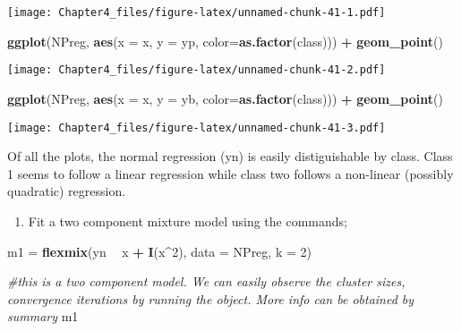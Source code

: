\documentclass[]{article}
\newenvironment{Shaded}{\begin{snugshade}}{\end{snugshade}}
\newcommand{\CommentTok}[1]{\textcolor[rgb]{0.56,0.35,0.01}{\textit{#1}}}
\newcommand{\DataTypeTok}[1]{\textcolor[rgb]{0.13,0.29,0.53}{#1}}
\newcommand{\DecValTok}[1]{\textcolor[rgb]{0.00,0.00,0.81}{#1}}
\newcommand{\KeywordTok}[1]{\textcolor[rgb]{0.13,0.29,0.53}{\textbf{#1}}}
\newcommand{\NormalTok}[1]{#1}
\newcommand{\OperatorTok}[1]{\textcolor[rgb]{0.81,0.36,0.00}{\textbf{#1}}}
\newcommand{\StringTok}[1]{\textcolor[rgb]{0.31,0.60,0.02}{#1}}
\providecommand{\tightlist}{%
  \setlength{\itemsep}{0pt}\setlength{\parskip}{0pt}}
\begin{document}
\texttt{[image: Chapter4\_files/figure-latex/unnamed-chunk-41-1.pdf]}

\begin{Shaded}
\begin{Highlighting}[]
\KeywordTok{ggplot}\NormalTok{(NPreg, }\KeywordTok{aes}\NormalTok{(}\DataTypeTok{x =}\NormalTok{ x, }\DataTypeTok{y =}\NormalTok{ yp, }\DataTypeTok{color=}\KeywordTok{as.factor}\NormalTok{(class))) }\OperatorTok{+}\StringTok{ }\KeywordTok{geom_point}\NormalTok{()}
\end{Highlighting}
\end{Shaded}

\texttt{[image: Chapter4\_files/figure-latex/unnamed-chunk-41-2.pdf]}

\begin{Shaded}
\begin{Highlighting}[]
\KeywordTok{ggplot}\NormalTok{(NPreg, }\KeywordTok{aes}\NormalTok{(}\DataTypeTok{x =}\NormalTok{ x, }\DataTypeTok{y =}\NormalTok{ yb, }\DataTypeTok{color=}\KeywordTok{as.factor}\NormalTok{(class))) }\OperatorTok{+}\StringTok{ }\KeywordTok{geom_point}\NormalTok{()}
\end{Highlighting}
\end{Shaded}

\texttt{[image: Chapter4\_files/figure-latex/unnamed-chunk-41-3.pdf]}

Of all the plots, the normal regression (yn) is easily distiguishable by
class. Class 1 seems to follow a linear regression while class two
follows a non-linear (possibly quadratic) regression.

\begin{enumerate}
\def\labelenumi{\alph{enumi}.}
\setcounter{enumi}{1}
\tightlist
\item
  Fit a two component mixture model using the commands;
\end{enumerate}

\begin{Shaded}
\begin{Highlighting}[]
\NormalTok{m1 =}\StringTok{ }\KeywordTok{flexmix}\NormalTok{(yn }\OperatorTok{~}\StringTok{ }\NormalTok{x }\OperatorTok{+}\StringTok{ }\KeywordTok{I}\NormalTok{(x}\OperatorTok{^}\DecValTok{2}\NormalTok{), }\DataTypeTok{data =}\NormalTok{ NPreg, }\DataTypeTok{k =} \DecValTok{2}\NormalTok{)}

\CommentTok{#this is a two component model. We can easily observe the cluster sizes, convergence iterations by running the object. More info can be obtained by summary}
\NormalTok{m1}
\end{Highlighting}
\end{Shaded}
\end{document}
